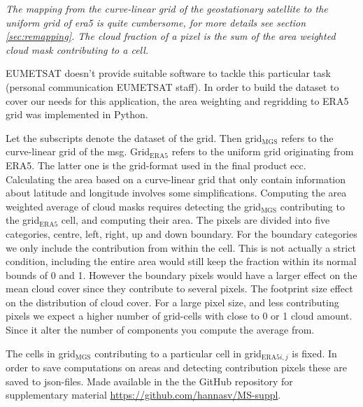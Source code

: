 \textit{The mapping from the curve-linear grid of the geostationary satellite to the uniform grid of era5 is quite cumbersome, for more details see section \ref{sec:remapping}. The cloud fraction of a pixel is the sum of the area weighted cloud mask contributing to a cell.}

EUMETSAT doesn't provide suitable software to tackle this particular task (personal communication EUMETSAT staff). In order to build the dataset to cover our needs for this application, the area weighting and regridding to ERA5 grid was implemented in Python.

Let the subscripts denote the dataset of the grid. Then grid$_{\text{MGS}}$ refers to the curve-linear grid of the \acrlong{msg}. Grid$_{\text{ERA5}}$ refers to the uniform grid originating from ERA5. The latter one is the grid-format used in the final product \acrlong{ecc}. Calculating the area based on a curve-linear grid that only contain information about latitude and longitude involves some simplifications. Computing the area weighted average of cloud masks requires detecting the grid$_{\text{MGS}}$ contributing to the grid$_{\text{ERA5}}$ cell, and computing their area. The pixels are divided into five categories, centre, left, right, up and down boundary. 
For the boundary categories we only include the contribution from within the cell. This is not actually a strict condition, including the entire area would still keep the fraction within its normal bounds of 0 and 1. However the boundary pixels would have a larger effect on the mean cloud cover since they contribute to several pixels. The footprint size effect on the distribution of cloud cover. For a large pixel size, and less contributing pixels we expect a higher number of grid-cells with close to 0 or 1 cloud amount. Since it alter the number of components you compute the average from.

The cells in grid$_{\text{MGS}}$ contributing to a particular cell in grid$_{\text{ERA5}i,j}$ is fixed. In order to save computations on areas and detecting contribution pixels these are saved to \acrshort{json}-files. Made available in the the GitHub repository for supplementary material \href{https://github.com/hannasv/MS-suppl}{https://github.com/hannasv/MS-suppl}.

